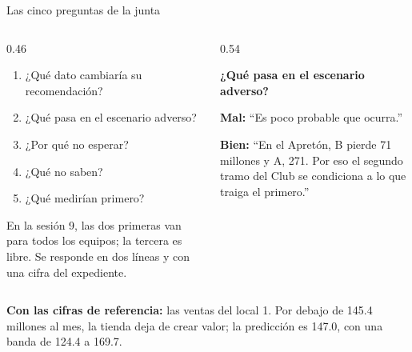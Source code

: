 \documentclass{beamer}
\begin{document}
\begin{frame}{Las cinco preguntas de la junta}
\begin{columns}[T]
\begin{column}{0.46\textwidth}
\begin{enumerate}\itemsep4pt
  \item ¿Qué dato cambiaría su recomendación?
  \item ¿Qué pasa en el escenario adverso?
  \item ¿Por qué no esperar?
  \item ¿Qué no saben?
  \item ¿Qué medirían primero?
\end{enumerate}
\medskip
{\footnotesize En la sesión 9, las dos primeras van para todos los equipos; la tercera es libre. Se responde en dos líneas y con una cifra del expediente.\par}
\end{column}
\begin{column}{0.54\textwidth}
{\footnotesize
\textbf{¿Qué pasa en el escenario adverso?}

\smallskip
\textcolor{naranjaosc}{\textbf{Mal:}} ``Es poco probable que ocurra.''

\smallskip
\textcolor{verdeosc}{\textbf{Bien:}} ``En el Apretón, B pierde 71 millones y A, 271. Por eso el segundo tramo del Club se condiciona a lo que traiga el primero.''\par}

\medskip
{}
\end{column}
\end{columns}
\medskip
{\footnotesize \textbf{Con las cifras de referencia:} las ventas del local 1. Por debajo de 145.4 millones al mes, la tienda deja de crear valor; la predicción es 147.0, con una banda de 124.4 a 169.7.\par}
\end{frame}
\end{document}

